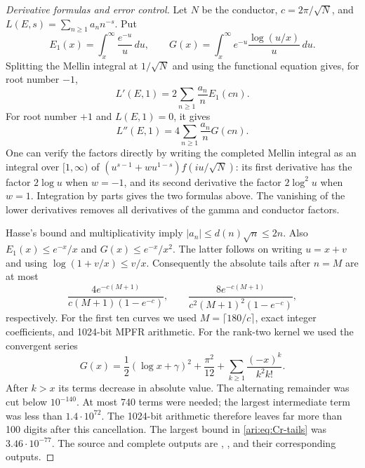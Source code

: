 \begin{proof}[Derivative formulas and error control]
Let $N$ be the conductor, $c=2\pi/\sqrt N$, and
$L(E,s)=\sum_{n\geq1}a_nn^{-s}$. Put
\[
 E_1(x)=\int_x^\infty\frac{e^{-u}}u\,du,
 \qquad G(x)=\int_x^\infty e^{-u}\frac{\log(u/x)}u\,du.
\]
Splitting the Mellin integral at $1/\sqrt N$ and using the functional
equation gives, for root number $-1$,
\begin{equation}\label{ari:eq:Cr-first}
 L'(E,1)=2\sum_{n\geq1}\frac{a_n}{n}E_1(cn).
\end{equation}
For root number $+1$ and $L(E,1)=0$, it gives
\begin{equation}\label{ari:eq:Cr-second}
 L''(E,1)=4\sum_{n\geq1}\frac{a_n}{n}G(cn).
\end{equation}
One can verify the factors directly by writing the completed Mellin
integral as an integral over $[1,\infty)$ of
$(u^{s-1}+wu^{1-s})f(iu/\sqrt N)$: its first derivative has
the factor $2\log u$ when $w=-1$, and its second derivative
the factor $2\log^2u$ when $w=1$. Integration by parts gives
the two formulas above. The vanishing of the lower derivatives
removes all derivatives of the gamma and conductor factors.

Hasse's bound and multiplicativity imply
$|a_n|\leq d(n)\sqrt n\leq2n$. Also
$E_1(x)\leq e^{-x}/x$ and $G(x)\leq e^{-x}/x^2$.
The latter follows on writing $u=x+v$ and using
$\log(1+v/x)\leq v/x$. Consequently the absolute tails after
$n=M$ are at most
\begin{equation}\label{ari:eq:Cr-tails}
 \frac{4e^{-c(M+1)}}{c(M+1)(1-e^{-c})},\qquad
 \frac{8e^{-c(M+1)}}{c^2(M+1)^2(1-e^{-c})},
\end{equation}
respectively. For the first ten curves we used
$M=\lceil180/c\rceil$, exact integer coefficients, and 1024-bit
MPFR arithmetic. For the rank-two kernel we used the convergent series
\[
 G(x)=\frac12(\log x+\gamma)^2+\frac{\pi^2}{12}
       +\sum_{k\geq1}\frac{(-x)^k}{k^2k!}.
\]
After $k>x$ its terms decrease in absolute value. The alternating
remainder was cut below $10^{-140}$. At most 740 terms were needed;
the largest intermediate term was less than $1.4\cdot10^{72}$.
The 1024-bit arithmetic therefore leaves far more than 100 digits
after this cancellation. The largest bound in
\eqref{ari:eq:Cr-tails} was $3.46\cdot10^{-77}$. The source and complete
outputs are ,
, and their corresponding outputs.


\end{proof}
